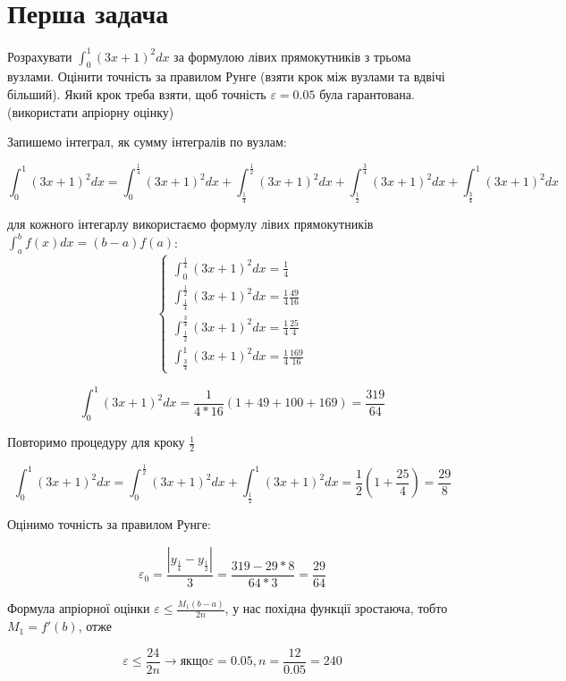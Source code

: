 
\section{Перша задача}

\begin{tcolorbox}[title=Задача 1]
    \begin{center}
        Розрахувати $\int_{0}^{1}(3x+1)^2dx$ за формулою лівих прямокутників з трьома вузлами. 
        Оцінити точність за правилом Рунге (взяти крок між вузлами та вдвічі більший). Який крок треба взяти, щоб точність $\varepsilon=0.05$ була гарантована.(використати апріорну оцінку) 
    \end{center}
\end{tcolorbox}



\begin{center}
    Запишемо інтеграл, як сумму інтегралів по вузлам:

    $$\int_{0}^{1}(3x+1)^2dx = \int_{0}^{\frac{1}{4}}(3x+1)^2dx + 
    \int_{\frac{1}{4}}^{\frac{1}{2}}(3x+1)^2dx + 
    \int_{\frac{1}{2}}^{\frac{3}{4}}(3x+1)^2dx + 
    \int_{\frac{3}{4}}^{1}(3x+1)^2dx$$

    для кожного інтегарлу використаємо формулу лівих прямокутників \
    $\int_{a}^{b}f(x)dx = (b-a)f(a)$:
    $$ 
    \begin{cases}
        \int_{0}^{\frac{1}{4}}(3x+1)^2dx = \frac{1}{4}\\
        \int_{\frac{1}{4}}^{\frac{1}{2}}(3x+1)^2dx = \frac{1}{4} \frac{49}{16} \\
        \int_{\frac{1}{2}}^{\frac{3}{4}}(3x+1)^2dx = \frac{1}{4} \frac{25}{4}\\
        \int_{\frac{3}{4}}^{1}(3x+1)^2dx = \frac{1}{4} \frac{169}{16}
    \end{cases}
    $$

    $$ 
    \int_{0}^{1}(3x+1)^2dx = \frac{1}{4 * 16}(1 + 49 + 100 + 169) = \frac{319}{64} 
    $$

    Повторимо процедуру для кроку $\frac{1}{2}$

    $$\int_{0}^{1}(3x+1)^2dx = \int_{0}^{\frac{1}{2}}(3x+1)^2dx + 
    \int_{\frac{1}{2}}^{1}(3x+1)^2dx = \frac{1}{2}(1 + \frac{25}{4}) = \frac{29}{8}$$

    Оцінимо точність за правилом Рунге:

    $$ \varepsilon_0 = \frac{|y_{\frac{1}{4}} - y_{\frac{1}{2}}|}{3} = 
    \frac{319 -29 * 8}{64 * 3}  = \frac{29}{64}$$

    Формула апріорної оцінки $\varepsilon \le \frac{M_1 (b-a)}{2n}$, 
    у нас похідна функції зростаюча, тобто $M_1 = f'(b)$, отже

    $$\varepsilon \le \frac{24}{2n} \rightarrow \text{якщо} \varepsilon = 0.05, 
    n = \frac{12}{0.05} = 240$$
\end{center}



